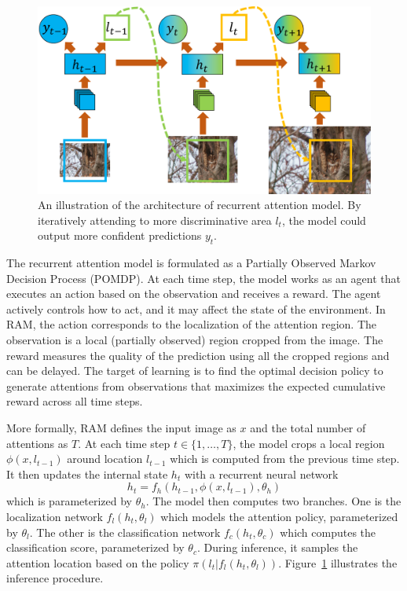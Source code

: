 \documentclass[10pt,twocolumn,letterpaper]{article}
\begin{document}
\setlength{\tabcolsep}{1pt}
\begin{figure}
\begin{center}
  \includegraphics[width=0.95\linewidth]{figs/model/ram.pdf}
\end{center}
\caption{An illustration of the architecture of recurrent attention model. By iteratively attending to more discriminative area $l_t$, the model could output more confident predictions $y_t$.}
\label{fig:ram}
\end{figure}

The recurrent attention model is formulated as a Partially Observed Markov Decision Process (POMDP).
At each time step, the model works as an agent that executes an action based on the observation and receives a reward.
The agent actively controls how to act, and it may affect the state of the environment.
In RAM, the action corresponds to the localization of the attention region.
The observation is a local (partially observed) region cropped from the image.
The reward measures the quality of the prediction using all the cropped regions and can be delayed.
The target of learning is to find the optimal decision policy to generate attentions from observations that maximizes the expected cumulative reward across all time steps.

More formally, RAM defines the input image as $x$ and the total number of attentions as $T$.
At each time step $t \in \{1, \ldots, T\}$, the model crops a local region $\phi(x, l_{t-1})$ around location $l_{t-1}$ which is computed from the previous time step.
It then updates the internal state $h_t$ with a recurrent neural network
\begin{equation}
  h_t = f_h(h_{t-1}, \phi(x, l_{t-1}), \theta_h)
\end{equation}
which is parameterized by $\theta_h$.
The model then computes two branches.
One is the localization network $f_l(h_t, \theta_l)$ which models the attention policy, parameterized by $\theta_l$.
The other is the classification network $f_c(h_t, \theta_c)$ which computes the classification score, parameterized by $\theta_c$.
During inference, it samples the attention location based on the policy $\pi(l_t | f_l(h_t, \theta_l))$. Figure~\ref{fig:ram} illustrates the inference procedure.
\end{document}

